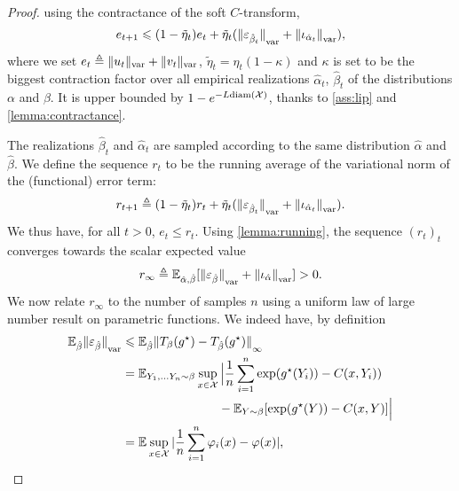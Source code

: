 \begin{proof}
using the contractance of the soft $C$-transform,
\begin{equation}
    \label{eq:ineq_var}
    e_{t+1} \leqslant 
    (1 - \tilde \eta_t) e_t
    + \tilde \eta_t
    ({\Vert \varepsilon_{\hat \beta_t} \Vert}_{\text{\upshape var}} + 
    {\Vert \iota_{\hat \alpha_t} \Vert}_{\text{\upshape var}}),
\end{equation}
where we set $e_t \triangleq \Vert u_t \Vert_{\text{\upshape var}} + \Vert v_t \Vert_{\text{\upshape var}}$,
$\tilde \eta_t = \eta_t (1-\kappa)$ and $\kappa$ is set to be the biggest
contraction factor over all empirical realizations $\hat \alpha_t$, $\hat
\beta_t$ of the distributions $\alpha$ and $\beta$. It is upper bounded by $1 -
e^{- L\text{diam}(\mathcal{X})}$, thanks to \autoref{ass:lip} and
\autoref{lemma:contractance}.

The realizations $\hat \beta_t$ and $\hat \alpha_t$
are sampled according to the same distribution $\hat \alpha$ and $\hat \beta$. We
define the sequence $r_t$ to be the running average of the variational norm of the
(functional) error term:
\begin{equation}
    r_{t+1} \triangleq (1 - \tilde \eta_t) r_t + \tilde \eta_t 
    ({\Vert \varepsilon_{\hat \beta_t} \Vert}_{\text{\upshape var}} + 
    {\Vert \iota_{\hat \alpha_t} \Vert}_{\text{\upshape var}}).
\end{equation}
We thus have, for all $t > 0$, $e_t \leq r_t$. Using \autoref{lemma:running}, the sequence $(r_t)_t$
converges towards the scalar expected value
\begin{equation}\label{eq:r_infty}
    r_\infty \triangleq \mathbb{E}_{\hat \alpha, \hat \beta}[{\Vert \varepsilon_{\hat \beta} \Vert}_{\text{\upshape var}}
    + {\Vert \iota_{\hat \alpha} \Vert}_{\text{\upshape var}}] > 0.
\end{equation}
We now relate $r_\infty$ to the number of samples $n$ using
a uniform law of large number result on parametric functions. We indeed have, by definition
\begin{align}
    \mathbb{E}_{\hat \beta} {\Vert \varepsilon_{\hat \beta} \Vert}_{\text{\upshape var}} 
    &\leqslant
    \mathbb{E}_{\hat \beta} {\Vert T_{\beta}(g^\star) 
    - T_{\hat \beta}(g^\star) \Vert}_{\infty} \\
    &= \mathbb{E}_{Y_1, \dots Y_n \sim \beta} 
    \sup_{x \in \mathcal{X}}
     \Big| \frac{1}{n} \sum_{i=1}^n \exp(g^\star(Y_i)) - C(x, Y_i)) \\
      &\phantom{=}\qquad\qquad\qquad\quad- \mathbb{E}_{Y \sim \beta}[\exp(g^\star(Y)) - C(x, Y)] \Big| \\
      &= \mathbb{E} \sup_{x \in \mathcal{X}} | \frac{1}{n} \sum_{i=1}^n \varphi_i(x) - \varphi(x) | ,
\end{align}

\end{proof}
